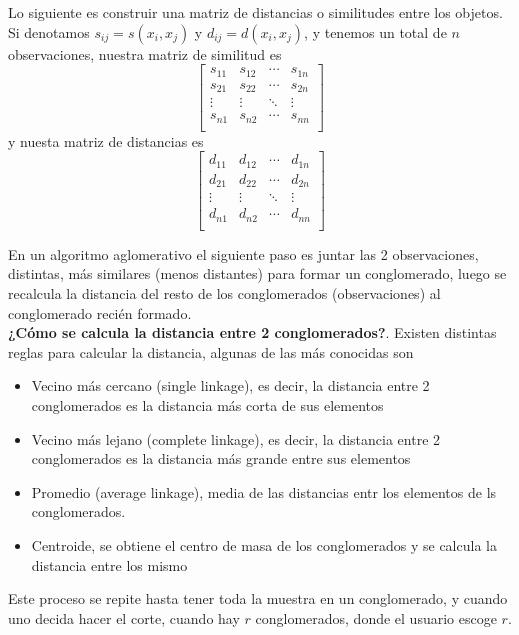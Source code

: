 \documentclass[12pt,oneside]{book}
\begin{document}
Lo siguiente es construir una matriz de distancias o similitudes entre los objetos. Si denotamos $s_{ij} = s(x_i, x_j)$ y $d_{ij} = d(x_i, x_j)$, y tenemos un total de $n$ observaciones, nuestra matriz de similitud es 
$$
	\left[\begin{array}{cccc}
		s_{11} &  s_{12} & \cdots & s_{1n}\\
		s_{21} &  s_{22} & \cdots & s_{2n}\\
		\vdots & \vdots & \ddots & \vdots\\
		s_{n1} &  s_{n2} & \cdots & s_{nn}\\
	\end{array}\right]
$$
y nuesta matriz de distancias es 
$$
	\left[\begin{array}{cccc}
		d_{11} &  d_{12} & \cdots & d_{1n}\\
		d_{21} &  d_{22} & \cdots & d_{2n}\\
		\vdots & \vdots & \ddots & \vdots\\
		d_{n1} &  d_{n2} & \cdots & d_{nn}\\
	\end{array}\right]
$$

En un algoritmo aglomerativo el siguiente paso es juntar las 2 observaciones, distintas, m\'as similares (menos distantes) para formar un conglomerado, luego se recalcula la distancia del resto de los conglomerados (observaciones) al conglomerado reci\'en formado. \\

\textbf{¿C\'omo se calcula la distancia entre 2 conglomerados?}. Existen distintas reglas para calcular la distancia, algunas de las m\'as conocidas son
\begin{itemize}
	\item Vecino m\'as cercano (single linkage), es decir, la distancia entre 2 conglomerados es la distancia m\'as corta de sus elementos
	\item Vecino m\'as lejano (complete linkage), es decir, la distancia entre 2 conglomerados es la distancia m\'as grande entre sus elementos
	\item Promedio (average linkage), media de las distancias entr los elementos de ls conglomerados.
	\item Centroide, se obtiene el centro de masa de los conglomerados y se calcula la distancia entre los mismo
\end{itemize}

Este proceso se repite hasta tener toda la muestra en un conglomerado, y cuando uno decida hacer el corte, cuando hay $r$ conglomerados, donde el usuario escoge $r$.
\end{document}
